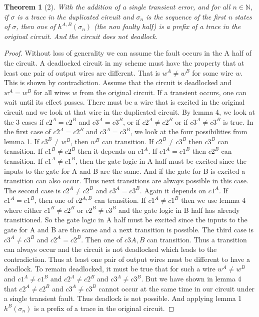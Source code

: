 \documentclass{article}
\newtheorem*{theorem}{Theorem}
\begin{document}
\begin{theorem}[2]
With the addition of a single transient error, and for all $n \in \mathbb{N}$, if $\sigma$ is a trace in the duplicated circuit and $\sigma_n$ is the sequence of the first n states of $\sigma$, then one of $h^{A,B}(\sigma_n)$ (the non faulty half) is a prefix of a trace in the original circuit.  And the circuit does not deadlock.  
\end{theorem}
\begin{proof}
Without loss of generality we can assume the fault occurs in the A half of the circuit. 
A deadlocked circuit in my scheme must have the property that at least one pair of output wires are different.  That is $w^A\neq w^B$ for some wire $w$.
This is shown by contradiction.  Assume that the circuit is deadlocked and $w^A = w^B$ for all wires $w$ from the original circuit.  If a transient occurs, one can wait until its effect passes.  There
 must be a wire that is excited in the original circuit and we look at that wire in the duplicated circuit. By lemma 4, we look at the 3 cases if $c2^A=c2^B$ and $c3^A=c3^B$, or if $c2^A\neq c2^B$ or if $c3^A\neq c3^B$ is true.  \newline
In the first case of $c2^A=c2^B$ and $c3^A=c3^B$, we look at the four possibilities from lemma 1.  If $c3^B\neq w^B$, then $w^B$ can transition.  If $c2^B\neq c3^B$ then $c3^B$ can transition.  If $c1^B\neq c2^B$ then it depends on $c1^A$.  If $c1^A=c1^B$ then $c2^B$ can transition.  If $c1^A\neq c1^B$, then the gate logic in A half must be excited since the inputs to the gate for A and B are the same.  And if the gate for B is excited a transition can also occur.  Thus next transitions are always possible in this case.\newline
The second case is  $c2^A\neq c2^B$ and $c3^A=c3^B$.  Again it depends on $c1^A$.  If $c1^A=c1^B$, then one of $c2^{A,B}$ can transition.  If $c1^A\neq c1^B$ then we use lemma 4 where either $c1^B \neq c2^B$ or $c2^B \neq c3^B$ and the gate logic in B half has already transitioned.  So the gate logic in A half must be excited since the inputs to the gate for A and B are the same and a next transition is possible.\newline
The third case is  $c3^A\neq c3^B$ and $c2^A=c2^B$.  Then one of $c3{A,B}$ can transition.\newline
Thus a transition can always occur and the circuit is not deadlocked which leads to the contradiction.  Thus at least one pair of output wires must be different to have a deadlock. To remain deadlocked, it must be true that for such a wire $w^A\neq w^B$ and $c1^A\neq c1^B$ and $c2^A\neq c2^B$ and $c3^A\neq c3^B$.  But we have shown in lemma 4 that $c2^A\neq c2^B$ and $c3^A\neq c3^B$ cannot occur at the same time in our circuit under a single transient fault. Thus deadlock is not possible.  And applying lemma 1 $h^B(\sigma_n)$ is a prefix of a trace in the original circuit. 
\end{proof}
\end{document}
